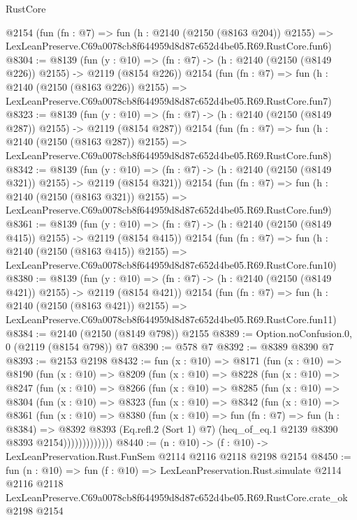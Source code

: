 \begin{lexlean}{RustCore}
\begin{coremodule}
    @2154
    (fun (fn : @7) =>
    fun (h : @2140 (@2150 (@8163 @204)) @2155) =>
    LexLeanPreserve.C69a0078cb8f644959d8d87c652d4be05.R69.RustCore.fun6)
@8304 := @8139
    (fun (y : @10) => (fn : @7) -> (h : @2140 (@2150 (@8149 @226)) @2155) -> @2119 (@8154 @226))
    @2154
    (fun (fn : @7) =>
    fun (h : @2140 (@2150 (@8163 @226)) @2155) =>
    LexLeanPreserve.C69a0078cb8f644959d8d87c652d4be05.R69.RustCore.fun7)
@8323 := @8139
    (fun (y : @10) => (fn : @7) -> (h : @2140 (@2150 (@8149 @287)) @2155) -> @2119 (@8154 @287))
    @2154
    (fun (fn : @7) =>
    fun (h : @2140 (@2150 (@8163 @287)) @2155) =>
    LexLeanPreserve.C69a0078cb8f644959d8d87c652d4be05.R69.RustCore.fun8)
@8342 := @8139
    (fun (y : @10) => (fn : @7) -> (h : @2140 (@2150 (@8149 @321)) @2155) -> @2119 (@8154 @321))
    @2154
    (fun (fn : @7) =>
    fun (h : @2140 (@2150 (@8163 @321)) @2155) =>
    LexLeanPreserve.C69a0078cb8f644959d8d87c652d4be05.R69.RustCore.fun9)
@8361 := @8139
    (fun (y : @10) => (fn : @7) -> (h : @2140 (@2150 (@8149 @415)) @2155) -> @2119 (@8154 @415))
    @2154
    (fun (fn : @7) =>
    fun (h : @2140 (@2150 (@8163 @415)) @2155) =>
    LexLeanPreserve.C69a0078cb8f644959d8d87c652d4be05.R69.RustCore.fun10)
@8380 := @8139
    (fun (y : @10) => (fn : @7) -> (h : @2140 (@2150 (@8149 @421)) @2155) -> @2119 (@8154 @421))
    @2154
    (fun (fn : @7) =>
    fun (h : @2140 (@2150 (@8163 @421)) @2155) =>
    LexLeanPreserve.C69a0078cb8f644959d8d87c652d4be05.R69.RustCore.fun11)
@8384 := @2140 (@2150 (@8149 @798)) @2155
@8389 := Option.noConfusion.{0, 0} (@2119 (@8154 @798)) @7
@8390 := @578 @7
@8392 := @8389 @8390 @7
@8393 := @2153 @2198
@8432 := fun (x : @10) =>
  @8171
    (fun (x : @10) =>
    @8190
      (fun (x : @10) =>
      @8209
        (fun (x : @10) =>
        @8228
          (fun (x : @10) =>
          @8247
            (fun (x : @10) =>
            @8266
              (fun (x : @10) =>
              @8285
                (fun (x : @10) =>
                @8304
                  (fun (x : @10) =>
                  @8323
                    (fun (x : @10) =>
                    @8342
                      (fun (x : @10) =>
                      @8361
                        (fun (x : @10) =>
                        @8380
                          (fun (x : @10) =>
                          fun (fn : @7) =>
                          fun (h : @8384) =>
                          @8392
                            @8393
                            (Eq.refl.{2} (Sort 1) @7)
                            (heq_of_eq.{1} @2139 @8390 @8393 @2154)))))))))))))
@8440 := (n : @10) -> (f : @10) -> LexLeanPreservation.Rust.FunSem @2114 @2116 @2118 @2198 @2154
@8450 := fun (n : @10) =>
  fun (f : @10) =>
  LexLeanPreservation.Rust.simulate
    @2114
    @2116
    @2118
    LexLeanPreserve.C69a0078cb8f644959d8d87c652d4be05.R69.RustCore.crate_ok
    @2198
    @2154
\end{coremodule}
\end{lexlean}
